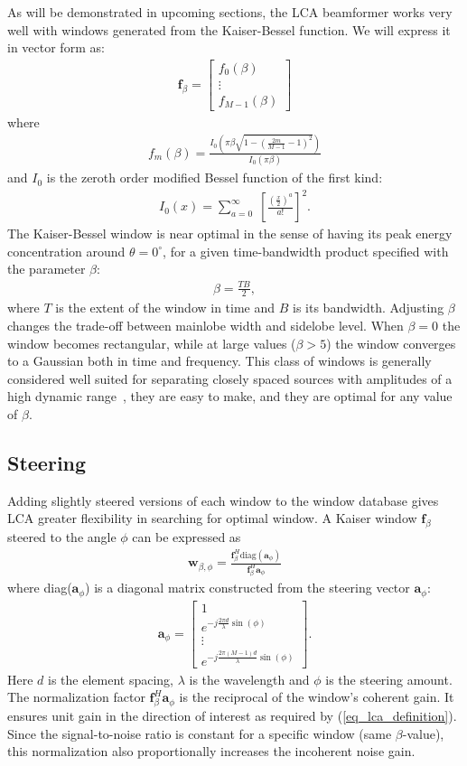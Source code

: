 \documentclass[10pt,journal,draftclsnofoot,onecolumn]{IEEEtran}
\newcommand\bmat[1]{\begin{bmatrix}#1\end{bmatrix}}
\newcommand\diag{\text{diag}}
\newcommand\sumb[2]{\sum\limits_{#1}^{#2}\;}
\renewcommand\H{^{\scriptscriptstyle H}}
\renewcommand\vec[1]{\boldsymbol{#1}}
\newcommand\1{\vec 1}
\renewcommand*\a{\vec a}
\newcommand*\f{\vec f}
\newcommand*\w{\vec w}
\begin{document}
As will be demonstrated in upcoming sections, the LCA beamformer works very well with windows generated from the Kaiser-Bessel function. We will express it in vector form as:
%
\begin{align*}
\f_\beta = \bmat{
f_0(\beta) \\
\vdots\\
f_{M-1}(\beta)
}
\end{align*}
%
where
%
\begin{align}
f_m(\beta) = \frac{I_0\left(\pi\beta\sqrt{1-\left(\frac{2m}{M-1}-1\right)^2}\right)}{I_0(\pi\beta)}
\end{align}
%
and $I_0$ is the zeroth order modified Bessel function of the first kind:
%
\begin{align}
I_0(x) = \sumb{a=0}{\infty} \left[ \frac{\left(\frac{x}{2}\right)^a}{a!} \right]^2.
\end{align}
%
The Kaiser-Bessel window is near optimal in the sense of having its peak energy concentration around $\theta=0^\circ$, for a given time-bandwidth product specified with the parameter $\beta$:
%
\begin{align}
\beta = \frac{TB}{2},
\end{align}
%
where $T$ is the extent of the window in time and $B$ is its bandwidth. Adjusting $\beta$ changes the trade-off between mainlobe width and sidelobe level. When $\beta=0$ the window becomes rectangular, while at large values ($\beta>5$) the window converges to a Gaussian both in time and frequency. This class of windows is generally considered well suited for separating closely spaced sources with amplitudes of a high dynamic range~\cite{Harris1978}, they are easy to make, and they are optimal for any value of $\beta$. 


\subsection{Steering}

Adding slightly steered versions of each window to the window database gives LCA greater flexibility in searching for optimal window. A Kaiser window $\f_\beta$ steered to the angle $\phi$ can be expressed as 
%
\begin{align}
\w_{\beta,\phi} = \frac{\f_\beta\H\diag{(\a_\phi)}}{\f_\beta\H\a_\phi}
\end{align}
%
where diag($\a_\phi$) is a diagonal matrix constructed from the steering vector $\a_\phi$:
%
\begin{align}
\a_\phi = \bmat{
1 \\
e^{-j\frac{2\pi d}{\lambda}\sin(\phi)} \\
\vdots\\
e^{-j\frac{2\pi (M-1)d}{\lambda}\sin(\phi)}
}.\label{steering_vector}
\end{align}
%
Here $d$ is the element spacing, $\lambda$ is the wavelength and $\phi$ is the steering amount. The normalization factor $\f_\beta\H\a_\phi$ is the reciprocal of the window's coherent gain. It ensures unit gain in the direction of interest as required by (\ref{eq_lca_definition}). Since the signal-to-noise ratio is constant for a specific window (same $\beta$-value), this normalization also proportionally increases the incoherent noise gain.
\end{document}
